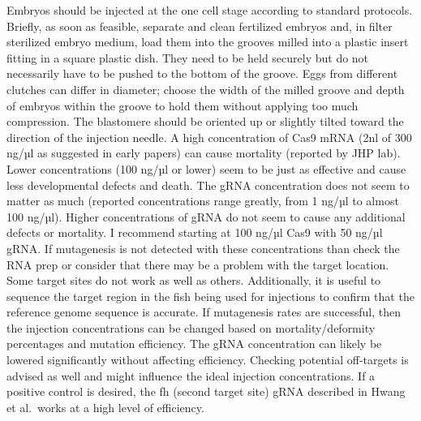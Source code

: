 \documentclass[
  letterpaper,
  DIV=11,
  numbers=noendperiod]{scrreprt}
\begin{document}
\begin{tcolorbox}[enhanced jigsaw, toprule=.15mm, breakable, coltitle=black, leftrule=.75mm, title=\textcolor{quarto-callout-note-color}{\faInfo}\hspace{0.5em}{Notes}, bottomrule=.15mm, toptitle=1mm, bottomtitle=1mm, colframe=quarto-callout-note-color-frame, opacityback=0, colback=white, opacitybacktitle=0.6, colbacktitle=quarto-callout-note-color!10!white, rightrule=.15mm, titlerule=0mm, arc=.35mm, left=2mm]

Embryos should be injected at the one cell stage according to standard
protocols. Briefly, as soon as feasible, separate and clean fertilized
embryos and, in filter sterilized embryo medium, load them into the
grooves milled into a plastic insert fitting in a square plastic dish.
They need to be held securely but do not necessarily have to be pushed
to the bottom of the groove. Eggs from different clutches can differ in
diameter; choose the width of the milled groove and depth of embryos
within the groove to hold them without applying too much compression.
The blastomere should be oriented up or slightly tilted toward the
direction of the injection needle. A high concentration of Cas9 mRNA
(2nl of 300 ng/µl as suggested in early papers) can cause mortality
(reported by JHP lab). Lower concentrations (100 ng/µl or lower) seem to
be just as effective and cause less developmental defects and death. The
gRNA concentration does not seem to matter as much (reported
concentrations range greatly, from 1 ng/µl to almost 100 ng/µl). Higher
concentrations of gRNA do not seem to cause any additional defects or
mortality. I recommend starting at 100 ng/µl Cas9 with 50 ng/µl gRNA. If
mutagenesis is not detected with these concentrations than check the RNA
prep or consider that there may be a problem with the target location.
Some target sites do not work as well as others. Additionally, it is
useful to sequence the target region in the fish being used for
injections to confirm that the reference genome sequence is accurate. If
mutagenesis rates are successful, then the injection concentrations can
be changed based on mortality/deformity percentages and mutation
efficiency. The gRNA concentration can likely be lowered significantly
without affecting efficiency. Checking potential off-targets is advised
as well and might influence the ideal injection concentrations. If a
positive control is desired, the fh (second target site) gRNA described
in Hwang et al.~works at a high level of efficiency.

\end{tcolorbox}
\end{document}
